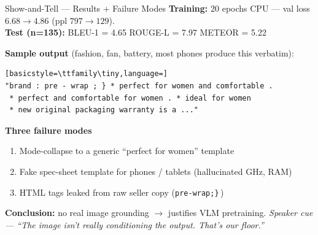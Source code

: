 \documentclass[10pt, aspectratio=169]{beamer}
\newcommand{\speakercue}[1]{%
  \vfill
  {\footnotesize\itshape\color{gray}Speaker cue --- #1}%
}
\begin{document}
\begin{frame}[fragile]{Show-and-Tell --- Results + Failure Modes}
  \textbf{Training:} 20 epochs CPU --- val loss $6.68 \rightarrow 4.86$ (ppl $797 \rightarrow 129$).\\
  \textbf{Test (n=135):} BLEU-1 = 4.65 \quad ROUGE-L = 7.97 \quad METEOR = 5.22

  \medskip
  \textbf{Sample output} (fashion, fan, battery, most phones produce this verbatim):
  \begin{lstlisting}[basicstyle=\ttfamily\tiny,language=]
"brand : pre - wrap ; } * perfect for women and comfortable .
 * perfect and comfortable for women . * ideal for women
 * new original packaging warranty is a ..."
  \end{lstlisting}

  \textbf{Three failure modes}
  \begin{enumerate}\itemsep2pt
    \item Mode-collapse to a generic ``perfect for women'' template
    \item Fake spec-sheet template for phones / tablets (hallucinated GHz, RAM)
    \item HTML tags leaked from raw seller copy (\texttt{pre-wrap;\}}\,)
  \end{enumerate}
  \textbf{Conclusion:} no real image grounding $\rightarrow$ justifies VLM pretraining.
  \speakercue{``The image isn't really conditioning the output. That's our floor.''}
\end{frame}
\end{document}
